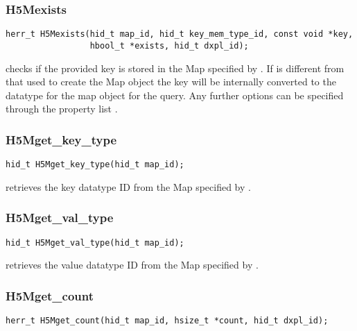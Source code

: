 \documentclass[../design_doc.tex]{subfiles}
\begin{document}
\subsubsection{H5Mexists}

\begin{verbatim}
herr_t H5Mexists(hid_t map_id, hid_t key_mem_type_id, const void *key,
                 hbool_t *exists, hid_t dxpl_id);
\end{verbatim}

 checks if the provided key is stored in the Map specified by . If  is different from that used to create the Map object the key will be internally converted to the datatype for the map object for the query. Any further options can be specified through the property list .

\subsubsection{H5Mget\_key\_type}

\begin{verbatim}
hid_t H5Mget_key_type(hid_t map_id);
\end{verbatim}

 retrieves the key datatype ID from the Map specified by .

\subsubsection{H5Mget\_val\_type}

\begin{verbatim}
hid_t H5Mget_val_type(hid_t map_id);
\end{verbatim}

 retrieves the value datatype ID from the Map specified by .

\subsubsection{H5Mget\_count}

\begin{verbatim}
herr_t H5Mget_count(hid_t map_id, hsize_t *count, hid_t dxpl_id);
\end{verbatim}
\end{document}
